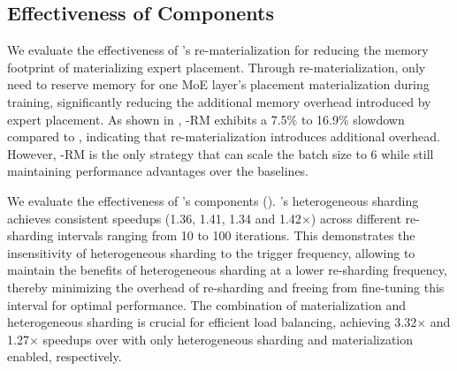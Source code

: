 

\subsection{Effectiveness of Components}

We evaluate the effectiveness of \xxx's re-materialization for reducing the memory footprint of materializing expert placement.
Through re-materialization, \xxx only need to reserve memory for one MoE layer's placement materialization during training, significantly reducing the additional memory overhead introduced by expert placement.
As shown in , \xxx-RM exhibits a 7.5\% to 16.9\% slowdown compared to \xxx, indicating that re-materialization introduces additional overhead.
However, \xxx-RM is the only strategy that can scale the batch size to 6 while still maintaining performance advantages over the baselines.





We evaluate the effectiveness of \xxx's components ().
\xxx's heterogeneous sharding achieves consistent speedups (1.36, 1.41, 1.34 and 1.42$\times$) across different re-sharding intervals ranging from 10 to 100 iterations.
This demonstrates the insensitivity of heterogeneous sharding to the trigger frequency, allowing \xxx to maintain the benefits of heterogeneous sharding at a lower re-sharding frequency, thereby minimizing the overhead of re-sharding and freeing \xxx from fine-tuning this interval for optimal performance.
The combination of materialization and heterogeneous sharding is crucial for efficient load balancing, achieving 3.32$\times$ and 1.27$\times$ speedups over \xxx with only heterogeneous sharding and materialization enabled, respectively.
